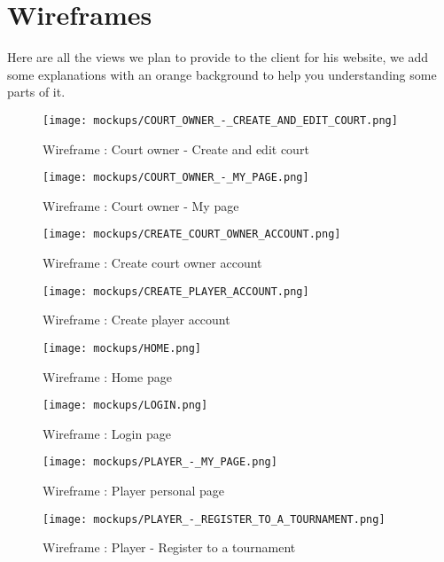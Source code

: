 \section{Wireframes}

Here are all the views we plan to provide to the client for his website, we
add some explanations with an orange background to help you understanding
some parts of it.

\begin{figure}[!ht]
    \centering
    \texttt{[image: mockups/COURT\_OWNER\_-\_CREATE\_AND\_EDIT\_COURT.png]}
    \caption{Wireframe : Court owner - Create and edit court}
\end{figure}
\FloatBarrier

\begin{figure}[!ht]
    \centering
    \texttt{[image: mockups/COURT\_OWNER\_-\_MY\_PAGE.png]}
    \caption{Wireframe : Court owner - My page}
\end{figure}
\FloatBarrier

\begin{figure}[!ht]
    \centering
    \texttt{[image: mockups/CREATE\_COURT\_OWNER\_ACCOUNT.png]}
    \caption{Wireframe : Create court owner account}
\end{figure}
\FloatBarrier

\begin{figure}[!ht]
    \centering
    \texttt{[image: mockups/CREATE\_PLAYER\_ACCOUNT.png]}
    \caption{Wireframe : Create player account}
\end{figure}
\FloatBarrier

\begin{figure}[!ht]
    \centering
    \texttt{[image: mockups/HOME.png]}
    \caption{Wireframe : Home page}
\end{figure}
\FloatBarrier

\begin{figure}[!ht]
    \centering
    \texttt{[image: mockups/LOGIN.png]}
    \caption{Wireframe : Login page}
\end{figure}
\FloatBarrier

\begin{figure}[!ht]
    \centering
    \texttt{[image: mockups/PLAYER\_-\_MY\_PAGE.png]}
    \caption{Wireframe : Player personal page}
\end{figure}
\FloatBarrier

\begin{figure}[!ht]
    \centering
    \texttt{[image: mockups/PLAYER\_-\_REGISTER\_TO\_A\_TOURNAMENT.png]}
    \caption{Wireframe : Player - Register to a tournament}
\end{figure}
\FloatBarrier

